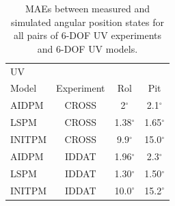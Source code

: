 
\begin{table}[htbp]
\ssp
\caption{\acfp{MAE} between measured and simulated angular position states for  
  all pairs of 6-\ac{DOF} \ac{UV} experiments and 6-\ac{DOF} \ac{UV} models.}
\begin{center}
\begin{tabular}{p{1.75cm}|ccc}
 \ac{UV}    &          &     &      \\
  Model     & Experiment & Rol & Pit  \\ \hline
\ac{AIDPM} & \ac{CROSS} & 2$^\circ$ & 2.1$^\circ$  \\
\ac{LSPM} & \ac{CROSS} & 1.38$^\circ$ & 1.65$^\circ$  \\
\ac{INITPM} & \ac{CROSS} & 9.9$^\circ$ & 15.0$^\circ$  \\
\ac{AIDPM} & \ac{IDDAT} & 1.96$^\circ$ & 2.3$^\circ$  \\
\ac{LSPM} & \ac{IDDAT} & 1.30$^\circ$ & 1.50$^\circ$  \\
\ac{INITPM} & \ac{IDDAT} & 10.0$^\circ$ & 15.2$^\circ$  \\
\end{tabular}
\end{center}
\label{chUV_AID.tb.SE3_pos_MAE}
\end{table}
%

